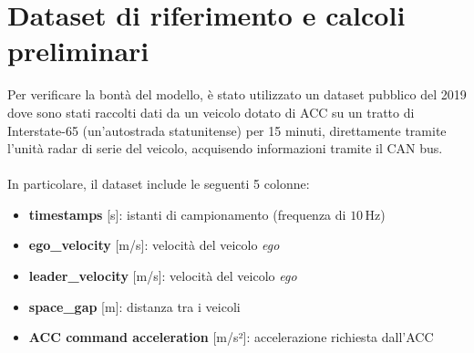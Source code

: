 \section{Dataset di riferimento e calcoli preliminari}
Per verificare la bontà del modello, è stato utilizzato un dataset pubblico del 2019 \cite{wang2019acc_dataset} dove sono stati raccolti 
dati da un veicolo dotato di ACC su un tratto di Interstate-65 (un'autostrada statunitense) per 15 minuti, 
direttamente tramite l'unità radar di serie del veicolo, acquisendo informazioni tramite il CAN bus.  
\\\\
\noindent In particolare, il dataset include le seguenti 5 colonne:
\begin{itemize}
    \item \textbf{timestamps} [s]: istanti di campionamento (frequenza di $10\, \mathrm{Hz}$)
    \item \textbf{ego\_velocity} [m/s]: velocità del veicolo \emph{ego}
    \item \textbf{leader\_velocity} [m/s]: velocità del veicolo \emph{ego}
    \item \textbf{space\_gap} [m]: distanza tra i veicoli
    \item \textbf{ACC command acceleration} [m/s²]: accelerazione richiesta dall'ACC
\end{itemize}

